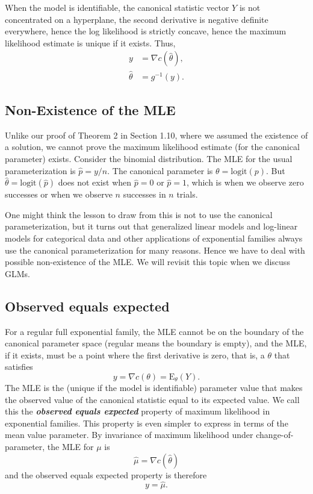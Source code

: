\documentclass[12pt]{article}
\newcommand{\E}{\mathrm{E}}
\DeclareMathOperator{\E}{E}
\begin{document}
When the model is identifiable, the canonical statistic vector $Y$ is not concentrated on a hyperplane, the second derivative is negative definite everywhere, hence the log likelihood is strictly concave, hence the maximum likelihood estimate is unique if it exists. Thus,
\begin{align*}
  y &= \nabla c(\hat{\theta}), \\
  \hat{\theta} &= g^{-1}(y).
\end{align*}

\vspace{0.5cm}



\subsection*{Non-Existence of the MLE}

Unlike our proof of Theorem 2 in Section 1.10, where we assumed the existence of a solution, we cannot prove the maximum likelihood estimate (for the canonical parameter) exists. Consider the binomial distribution. The MLE for the usual parameterization is $\hat p = y/n$. The canonical parameter is $\theta = \text{logit}(p)$. But $\hat \theta = \text{logit}(\hat p)$ does not exist when $\hat p = 0$ or $\hat p = 1$, which is when we observe zero successes or when we observe $n$ successes in $n$ trials.

One might think the lesson to draw from this is not to use the canonical parameterization, but it turns out that generalized linear models and log-linear models for categorical data and other applications of exponential families always use the canonical parameterization for many reasons. Hence we have to deal with possible non-existence of the MLE. We will revisit this topic when we discuss GLMs.


\subsection*{Observed equals expected}

For a regular full exponential family, the MLE cannot be on the boundary of the canonical parameter space (regular means the boundary is empty), and the MLE, if it exists, must be a point where the first derivative is zero, that is, a $\theta$ that satisfies
$$
  y = \nabla c(\theta) = \E_\theta(Y).
$$
The MLE is the (unique if the model is identifiable) parameter value that makes the observed value of the canonical statistic equal to its expected value. We call this the {\bf \emph{observed equals expected}} property of maximum likelihood in exponential families. This property is even simpler to express in terms of the mean value parameter. By invariance of maximum likelihood under change-of-parameter, the MLE for $\mu$ is 
$$
  \hat\mu = \nabla c(\hat\theta)
$$
and the observed equals expected property is therefore
\begin{equation} \label{obsequalsexp}
  y = \hat\mu.	
\end{equation}
\end{document}
